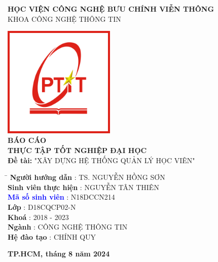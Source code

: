 \documentclass[report.tex]{subfiles}
\begin{document}
\pagebreak

\begin{titlepage}
    \begin{center}
        \textbf{HỌC VIỆN CÔNG NGHỆ BƯU CHÍNH VIỄN THÔNG}\\
        KHOA CÔNG NGHỆ THÔNG TIN\\
        \vspace{1cm}
        \vspace{-8pt}\hrulefill\raisebox{-2.1pt}\quad\decofourleft\decotwo\decofourright\quad\hrulefill

        \vspace{2cm}
        \centering\includegraphics[width=0.4\textwidth]{../meta/logo.PTIT.png}\\
        \vspace{2cm}
        \textbf{\Huge BÁO CÁO\\
            THỰC TẬP TỐT NGHIỆP ĐẠI HỌC}\\
        \vspace{1cm}
        \textbf{\Large Đề tài:} {\large "XÂY DỰNG HỆ THỐNG QUẢN LÝ HỌC VIÊN"} \\

        \vfill

        \begin{tabbing}
            \hspace{8cm} \= \hspace{10cm} \kill
            \textbf{Người hướng dẫn} \> :  TS. NGUYỄN HỒNG SƠN \\
            \textbf{Sinh viên thực hiện} \> :  NGUYỄN TÂN THIÊN \\
            \textbf{\textcolor{blue}{Mã số sinh viên}} \> :  N18DCCN214 \\
            \textbf{Lớp} \> : D18CQCP02-N \\
            \textbf{Khoá} \> : 2018 - 2023 \\
            \textbf{Ngành} \> : CÔNG NGHỆ THÔNG TIN \\
            \textbf{Hệ đào tạo} \> : CHÍNH QUY \\
        \end{tabbing}

    \end{center}
    \vfill
    \begin{center}
        \textbf{TP.HCM, tháng 8 năm 2024}
    \end{center}

\end{titlepage}

\pagebreak
\end{document}
